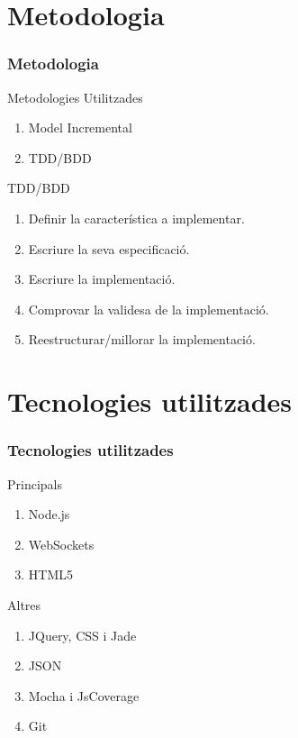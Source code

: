 \documentclass[notitlepage]{beamer}
\begin{document}
\section{Metodologia}
\begin{frame}
\frametitle{Metodologia}
\begin{block}{Metodologies Utilitzades}
    \begin{enumerate}
    \item{Model Incremental}
    \item{TDD/BDD}
    \end{enumerate}
\end{block}
\begin{block}{TDD/BDD}
    \begin{enumerate}
    \item{Definir la característica a implementar.}
    \item{Escriure la seva especificació.}
    \item{Escriure la implementació.}
    \item{Comprovar la validesa de la implementació.}
    \item{Reestructurar/millorar la implementació.}
    \end{enumerate}
\end{block}
\end{frame}

\section{Tecnologies utilitzades}
\begin{frame}
\frametitle{Tecnologies utilitzades}
\begin{block}{Principals}
    \begin{enumerate}
    \item{Node.js}
    \item{WebSockets}
    \item{HTML5}
    \end{enumerate}
\end{block}
\begin{block}{Altres}
    \begin{enumerate}
    \item{JQuery, CSS i Jade}
    \item{JSON}
    \item{Mocha i JsCoverage}
    \item{Git}
    \end{enumerate}
\end{block}
\end{frame}
\end{document}
